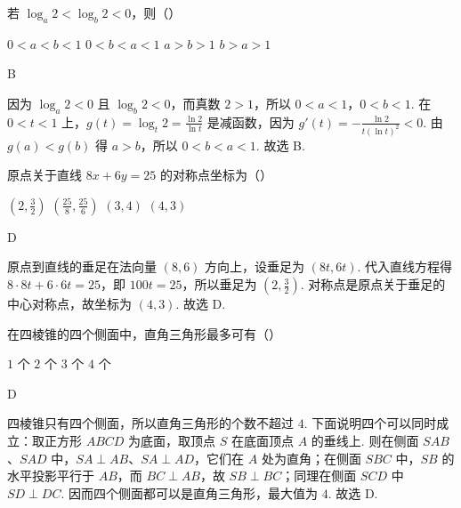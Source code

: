 \begin{problem}
若 \(\log_a 2 < \log_b 2 < 0\)，则（\quad）

\choices
    {\(0 < a < b < 1\)}
    {\(0 < b < a < 1\)}
    {\(a > b > 1\)}
    {\(b > a > 1\)}

\begin{answer}
B
\end{answer}

\begin{solution}
因为 \(\log_a2<0\) 且 \(\log_b2<0\)，而真数 \(2>1\)，所以 \(0<a<1\)，\(0<b<1\). 在 \(0<t<1\) 上，\(g(t)=\log_t2=\frac{\ln2}{\ln t}\) 是减函数，因为 \(g'(t)=-\frac{\ln2}{t(\ln t)^2}<0\). 由 \(g(a)<g(b)\) 得 \(a>b\)，所以 \(0<b<a<1\). 故选 B.
\end{solution}
\end{problem}

\begin{problem}
原点关于直线 \(8x + 6y = 25\) 的对称点坐标为（\quad）

\choices
    {\(\left(2,\frac{3}{2}\right)\)}
    {\(\left(\frac{25}{8}, \frac{25}{6}\right)\)}
    {\(\left(3,4\right)\)}
    {\(\left(4,3\right)\)}

\begin{answer}
D
\end{answer}

\begin{solution}
原点到直线的垂足在法向量 \((8,6)\) 方向上，设垂足为 \((8t,6t)\). 代入直线方程得 \(8\cdot8t+6\cdot6t=25\)，即 \(100t=25\)，所以垂足为 \(\left(2,\frac{3}{2}\right)\). 对称点是原点关于垂足的中心对称点，故坐标为 \(\left(4,3\right)\). 故选 D.
\end{solution}
\end{problem}

\begin{problem}
在四棱锥的四个侧面中，直角三角形最多可有（\quad）

\choices
    {\(1\) 个}
    {\(2\) 个}
    {\(3\) 个}
    {\(4\) 个}

\begin{answer}
D
\end{answer}

\begin{solution}
四棱锥只有四个侧面，所以直角三角形的个数不超过 \(4\). 下面说明四个可以同时成立：取正方形 \(ABCD\) 为底面，取顶点 \(S\) 在底面顶点 \(A\) 的垂线上. 则在侧面 \(SAB\)、\(SAD\) 中，\(SA\perp AB\)、\(SA\perp AD\)，它们在 \(A\) 处为直角；在侧面 \(SBC\) 中，\(SB\) 的水平投影平行于 \(AB\)，而 \(BC\perp AB\)，故 \(SB\perp BC\)；同理在侧面 \(SCD\) 中 \(SD\perp DC\). 因而四个侧面都可以是直角三角形，最大值为 \(4\). 故选 D.
\end{solution}
\end{problem}

